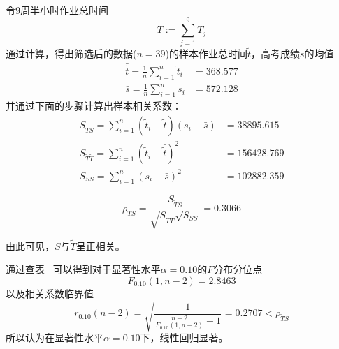 \documentclass{article}
\begin{document}
\begin{CJK}{UTF8}{song}
令9周半小时作业总时间
      \begin{equation}
          \tilde{T}:=\sum_{j=1}^{9}T_j
      \end{equation}
通过计算，得出筛选后的数据($n=39$)的样本作业总时间$\tilde{t}$，高考成绩$s$的均值
\begin{align*}
    \bar{\tilde{t}}=\frac{1}{n}\sum_{i=1}^n{\tilde{t}_i}&=368.577 \\
    \bar{s}=\frac{1}{n}\sum_{i=1}^n{s_i}&=572.128
\end{align*}
并通过下面的步骤计算出样本相关系数：
\begin{align*}
    S_{\tilde{T}S}=\sum_{i=1}^n(\tilde{t}_i-\bar{\tilde{t}})(s_i-\bar{s})&=38895.615  \\
    S_{\tilde{T}\tilde{T}}=\sum_{i=1}^n(\tilde{t}_i-\bar{\tilde{t}})^2&=156428.769 \\
    S_{SS}=\sum_{i=1}^n(s_i-\bar{s})^2&=102882.359
\end{align*}

\begin{equation}
  \rho_{\tilde{T}S}=\frac{S_{\tilde{T}S}}{\sqrt{S_{\tilde{T}\tilde{T}}}\sqrt{S_{SS}}}=0.3066
\end{equation}

由此可见，$S$与$\tilde{T}$呈正相关。

通过查表~\cite[Appendix~B]{}%
可以得到对于显著性水平$\alpha=0.10$的$F$分布分位点
\begin{equation}
  F_{0.10}(1,n-2)=2.8463
\end{equation}
以及相关系数临界值
\begin{equation}
  r_{0.10}(n-2)=\sqrt{\frac{1}{\frac{n-2}{F_{0.10}(1,n-2)}+1}}=0.2707<\rho_{\tilde{T}S}
\end{equation}
所以认为在显著性水平$\alpha=0.10$下，线性回归显著。


\end{CJK}
\end{document}
